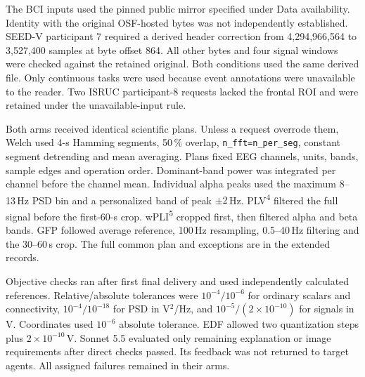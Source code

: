 The BCI inputs used the pinned public mirror specified under Data availability. Identity with the original OSF-hosted bytes was not independently established. SEED-V participant 7 required a derived header correction from 4,294,966,564 to 3,527,400 samples at byte offset 864. All other bytes and four signal windows were checked against the retained original. Both conditions used the same derived file. Only continuous tasks were used because event annotations were unavailable to the reader. Two ISRUC participant-8 requests lacked the frontal ROI and were retained under the unavailable-input rule.

Both arms received identical scientific plans. Unless a request overrode them, Welch used 4-s Hamming segments, 50\,\% overlap, \texttt{n\_fft=n\_per\_seg}, constant segment detrending and mean averaging. Plans fixed EEG channels, units, bands, sample edges and operation order. Dominant-band power was integrated per channel before the channel mean. Individual alpha peaks used the maximum 8--13\,Hz PSD bin and a personalized band of peak \(\pm2\)\,Hz. PLV\textsuperscript{4} filtered the full signal before the first-60-s crop. wPLI\textsuperscript{5} cropped first, then filtered alpha and beta bands. GFP followed average reference, 100\,Hz resampling, 0.5--40\,Hz filtering and the 30--60\,s crop. The full common plan and exceptions are in the extended records.

Objective checks ran after first final delivery and used independently calculated references. Relative/absolute tolerances were \(10^{-4}/10^{-6}\) for ordinary scalars and connectivity, \(10^{-4}/10^{-18}\) for PSD in V\(^{2}\)/Hz, and \(10^{-5}/(2\times10^{-10})\) for signals in V. Coordinates used \(10^{-6}\) absolute tolerance. EDF allowed two quantization steps plus \(2\times10^{-10}\)\,V. Sonnet 5.5 evaluated only remaining explanation or image requirements after direct checks passed. Its feedback was not returned to target agents. All assigned failures remained in their arms.

